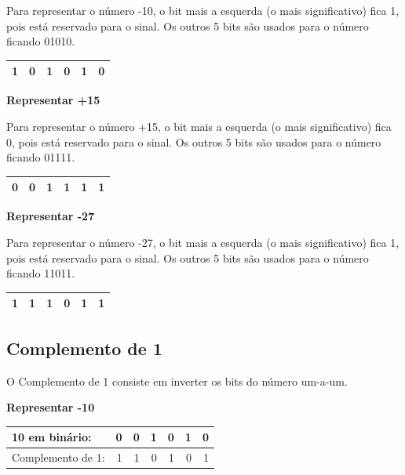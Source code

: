 Para representar o número -10, o bit mais a esquerda (o mais significativo) fica 1, pois está reservado para o sinal. Os outros 5 bits são usados para o número ficando 01010.

\begin{table}[h]
	\centering
	\begin{tabular}{|r|r|r|r|r|r|}
		\hline
		1 & 0 & 1  & 0 &  1 & 0 \\
		\hline
	\end{tabular}
\end{table}


\noindent\textbf{Representar +15}

Para representar o número +15, o bit mais a esquerda (o mais significativo) fica 0, pois está reservado para o sinal. Os outros 5 bits são usados para o número ficando 01111.

\begin{table}[h]
	\centering
	\begin{tabular}{|r|r|r|r|r|r|}
		\hline
		0 & 0 & 1  & 1 &  1 & 1 \\
		\hline
	\end{tabular}
\end{table}

\noindent\textbf{Representar -27}

Para representar o número -27, o bit mais a esquerda (o mais significativo) fica 1, pois está reservado para o sinal. Os outros 5 bits são usados para o número ficando 11011.

\begin{table}[h]
	\centering
	\begin{tabular}{|r|r|r|r|r|r|}
		\hline
		1 & 1 & 1  & 0 &  1 & 1 \\
		\hline
	\end{tabular}
\end{table}

\subsection{Complemento de 1}
\label{compl1}
O Complemento de 1 consiste em inverter os bits do número um-a-um. 

\noindent\textbf{Representar -10}
\begin{table}[h]
	\centering
	\begin{tabular}{|l|r|r|r|r|r|r|}
		\hline
		10 em binário: 		& 0 & 0 & 1  & 0 &  1 & 0 \\
		\hline
		Complemento de 1: 	& 1 & 1 & 0  & 1 &  0 & 1 \\
		\hline
	\end{tabular}
\end{table}

